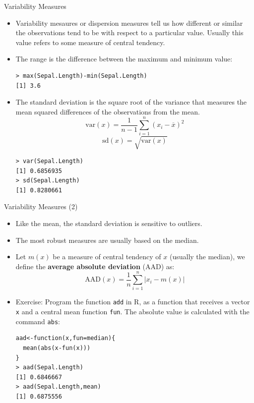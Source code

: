 \documentclass[handout]{beamer}
\begin{document}
\begin{frame}[fragile]{Variability Measures}
\scriptsize{ 
\begin{itemize}
 \item Variability mesaures or dispersion measures tell us how different or similar the observations tend to be with respect to a particular value. Usually this value refers to some measure of central tendency.
 \item  The range is the difference between the maximum and minimum value:
 \begin{verbatim}
> max(Sepal.Length)-min(Sepal.Length)
[1] 3.6
 \end{verbatim}
 \item The standard deviation is the square root of the variance that measures the mean squared differences of the observations from the mean.  
 \begin{displaymath}
  \text{var}(x)=\frac{1}{n-1}\sum_{i=1}^{n}(x_{i} - \overline{x} )^2
 \end{displaymath}
 \begin{displaymath}
  \text{sd}(x)=\sqrt{\text{var}(x)}
 \end{displaymath}

\begin{verbatim}
> var(Sepal.Length)
[1] 0.6856935
> sd(Sepal.Length)
[1] 0.8280661 
\end{verbatim}



\end{itemize}
 
 
 
} 
\end{frame}


\begin{frame}[fragile]{Variability Measures (2)}
\scriptsize{ 
\begin{itemize}
 \item Like the mean, the standard deviation is sensitive to outliers.
 \item The most robust measures are usually based on the median.

  \item Let $m(x)$ be a measure of central tendency of $x$ (usually the median), we define the \textbf{average absolute deviation} (AAD)  as:
  \begin{displaymath}
   \text{AAD}(x) = \frac{1}{n}\sum_{i=1}^{n}|x_i-m(x)| 
  \end{displaymath}
  
  \item Exercise: Program the function \verb+add+ in R, as a function that receives a vector \verb+x+ and a central mean function \verb+fun+. The absolute value is calculated with the command \verb+abs+:
  
  \begin{verbatim}
aad<-function(x,fun=median){
  mean(abs(x-fun(x)))
}
> aad(Sepal.Length)
[1] 0.6846667
> aad(Sepal.Length,mean)
[1] 0.6875556
  \end{verbatim}


\end{itemize}
 
 
 
} 
\end{frame}
\end{document}
